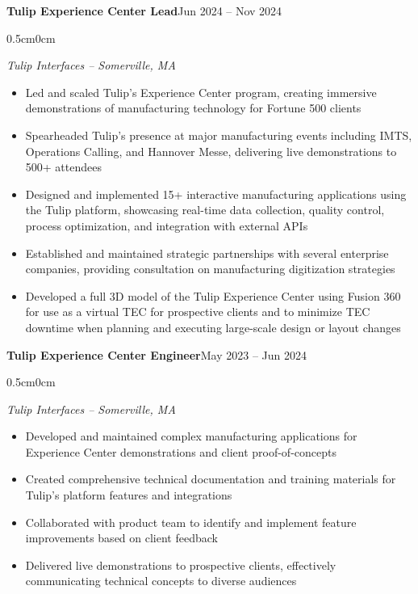 \documentclass[10pt]{article}
\newenvironment{onecolentry}{
    \begin{adjustwidth}{0.5cm}{0cm}
}{
    \end{adjustwidth}
}
\newenvironment{highlights}{
    \begin{itemize}[
        leftmargin=0.5cm,
        rightmargin=0cm,
        itemindent=0cm,
        labelwidth=0.3cm,
        labelsep=0.2cm,
        align=left,
        itemsep=0.05cm,
        topsep=0.05cm,
        parsep=0.05cm,
        partopsep=0pt
    ]
}{
    \end{itemize}
    \vspace{0.1cm}
}
\begin{document}
    \begin{twocolentry}{\textbf{Tulip Experience Center Lead}}{Jun 2024 -- Nov 2024}
    \end{twocolentry}
    \begin{onecolentry}
    \textit{Tulip Interfaces -- Somerville, MA}
    \begin{highlights}
        \item Led and scaled Tulip's Experience Center program, creating immersive demonstrations of manufacturing technology for Fortune 500 clients
        \item Spearheaded Tulip's presence at major manufacturing events including IMTS, Operations Calling, and Hannover Messe, delivering live demonstrations to 500+ attendees
        \item Designed and implemented 15+ interactive manufacturing applications using the Tulip platform, showcasing real-time data collection, quality control, process optimization, and integration with external APIs
        \item Established and maintained strategic partnerships with several enterprise companies, providing consultation on manufacturing digitization strategies
        \item Developed a full 3D model of the Tulip Experience Center using Fusion 360 for use as a virtual TEC for prospective clients and to minimize TEC downtime when planning and executing large-scale design or layout changes
    \end{highlights}
    \end{onecolentry}

    \begin{twocolentry}{\textbf{Tulip Experience Center Engineer}}{May 2023 -- Jun 2024}
    \end{twocolentry}
    \begin{onecolentry}
    \textit{Tulip Interfaces -- Somerville, MA}
    \begin{highlights}
        \item Developed and maintained complex manufacturing applications for Experience Center demonstrations and client proof-of-concepts
        \item Created comprehensive technical documentation and training materials for Tulip's platform features and integrations
        \item Collaborated with product team to identify and implement feature improvements based on client feedback
        \item Delivered live demonstrations to prospective clients, effectively communicating technical concepts to diverse audiences
    \end{highlights}
    \end{onecolentry}
\end{document}
